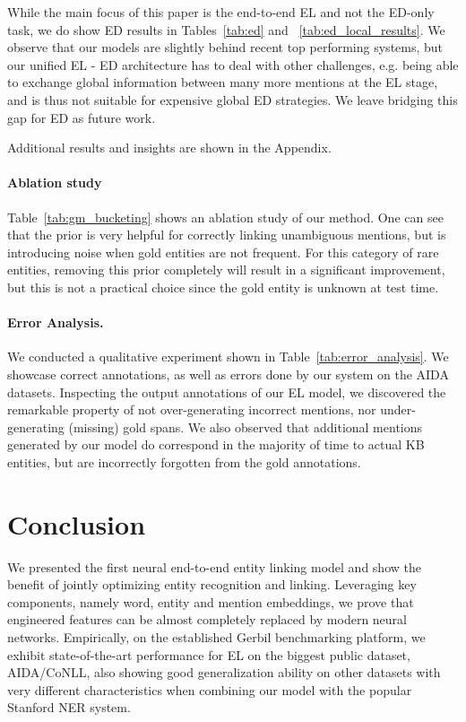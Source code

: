 \documentclass[11pt,a4paper]{article}
\begin{document}
While the main focus of this paper is the end-to-end EL and not the ED-only task, we do show ED results in Tables~\ref{tab:ed} and ~\ref{tab:ed_local_results}. We observe that our models are slightly behind recent top performing systems, but our unified EL - ED architecture has to deal with other challenges, e.g. being able to exchange global information between many more mentions at the EL stage, and is thus not suitable for expensive global ED strategies. We leave bridging this gap for ED as future work.


Additional results and insights are shown in the Appendix. 



\paragraph{Ablation study}
Table~\ref{tab:gm_bucketing} shows an ablation study of our method. One can see that the  prior is very helpful for correctly linking unambiguous mentions, but is introducing noise when gold entities are not frequent. For this category of rare entities, removing this prior completely will result in a significant improvement, but this is not a practical choice since the gold entity is unknown at test time.


\paragraph{Error Analysis.}
We conducted a qualitative experiment shown in Table~\ref{tab:error_analysis}. We showcase correct annotations, as well as errors done by our system on the AIDA datasets. Inspecting the output annotations of our EL model, we discovered the remarkable property of not over-generating incorrect mentions, nor under-generating (missing) gold spans. We also observed that additional mentions generated by our model do correspond in the majority of time to actual KB entities, but are incorrectly forgotten from the gold annotations. 
 
\section{Conclusion}
We presented the first neural end-to-end entity linking model and show the benefit of jointly optimizing entity recognition and linking. Leveraging key components, namely word, entity and mention embeddings, we prove that engineered features can be almost completely replaced by modern neural networks. Empirically, on the established Gerbil benchmarking platform, we exhibit state-of-the-art performance for EL on the biggest public dataset, AIDA/CoNLL, also showing good generalization ability on other datasets with very different characteristics when combining our model with the popular Stanford NER system.  
\end{document}
